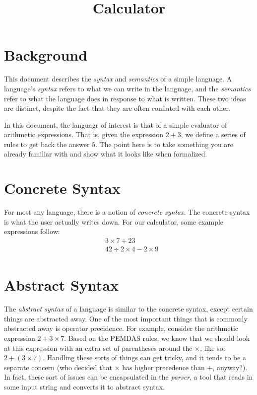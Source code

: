 \documentclass[nocopyrightspace]{sigplanconf}
\begin{document}
\title{Calculator}
\authorinfo{}{}{}
\date{}
\maketitle

\section{Background}
This document describes the \emph{syntax} and \emph{semantics} of a simple language.
A language's \emph{syntax} refers to what we can write in the language, and the \emph{semantics} refer to what the language does in response to what is written.
These two ideas are distinct, despite the fact that they are often conflated with each other.

In this document, the languagr of interest is that of a simple evaluator of arithmetic expressions.
That is, given the expression $2 + 3$, we define a series of rules to get back the answer $5$.
The point here is to take something you are already familiar with and show what it looks like when formalized.

\section{Concrete Syntax}
For most any language, there is a notion of \emph{concrete syntax}.
The concrete syntax is what the user actually writes down.
For our calculator, some example expressions follow:
\begin{align*}
  &3 \times 7 + 23\\
  &42 \div  2 \times 4 - 2 \times 9\\
\end{align*}

\section{Abstract Syntax}
The \emph{abstract syntax} of a language is similar to the concrete syntax, except certain things are abstracted away.
One of the most important things that is commonly abstracted away is operator precidence.
For example, consider the arithmetic expression $2 + 3 \times 7$.
Based on the PEMDAS rules, we know that we should look at this expression with an extra set of parentheses around the $\times$, like so: $2 + (3 \times 7)$.
Handling these sorts of things can get tricky, and it tends to be a separate concern (who decided that $\times$ has higher precedence than $+$, anyway?).
In fact, these sort of issues can be encapsulated in the \emph{parser}, a tool that reads in some input string and converts it to abstract syntax.
\end{document}
